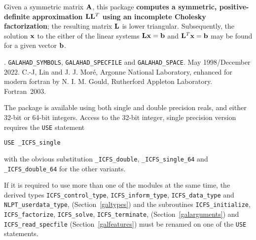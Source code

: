 \documentclass{galahad}
\newcommand{\packagename}{ICFS}
\newcommand{\fullpackagename}{\libraryname\_\packagename}
\begin{document}
\galheader


\galsummary
Given a symmetric matrix ${\mathbf{A}}$, this package
{\bf computes a symmetric, positive-definite approximation
${\mathbf{L}} {\mathbf{L}}^T$ using an incomplete Cholesky factorization}; the
resulting matrix ${\mathbf{L}}$ is lower triangular.
Subsequently, the solution ${\mathbf{x}}$ to the either of the linear systems
${\mathbf{L}} {\mathbf{x}} = {\mathbf{b}}$ and ${\mathbf{L}}^T {\mathbf{x}} = {\mathbf{b}}$
may be found for a given vector ${\mathbf{b}}$.


\galattributes
\galversions{\tt  \fullpackagename\_single, \fullpackagename\_double}.
\galuses
{\tt GALAHAD\_SY\-M\-BOLS},
{\tt GALAH\-AD\-\_\-SP\-ECFILE} and
{\tt GALAHAD\_SPACE}.
\galdate May 1998/December 2022.
\galorigin C.-J, Lin and J. J. Mor\'{e}, Argonne National Laboratory,
enhanced for modern fortran by N. I. M. Gould, Rutherford Appleton Laboratory.
\gallanguage Fortran~2003.


\galhowto

The package is available using both single and double precision reals, 
and either 32-bit or 64-bit integers. Access to the 32-bit integer,
single precision version requires the {\tt USE} statement
\medskip

\hspace{8mm} {\tt USE \fullpackagename\_single}

\medskip
\noindent
with the obvious substitution {\tt \fullpackagename\_double},
{\tt \fullpackagename\_single\_64} and 
{\tt \fullpackagename\_double\_64} for the other variants.

\noindent
If it is required to use more than one of the modules at the same time, 
the derived types
{\tt \packagename\_control\_type},
{\tt \packagename\_inform\_type},
{\tt \packagename\_data\_type}
and
{\tt NLPT\_userdata\_type},
(Section~\ref{galtypes})
and the subroutines
{\tt \packagename\_initialize},
{\tt \packagename\_\-factorize},
{\tt \packagename\_\-solve},
{\tt \packagename\_terminate},
(Section~\ref{galarguments})
and
{\tt \packagename\_read\_specfile}
(Section~\ref{galfeatures})
must be renamed on one of the {\tt USE} statements.




\end{document}
